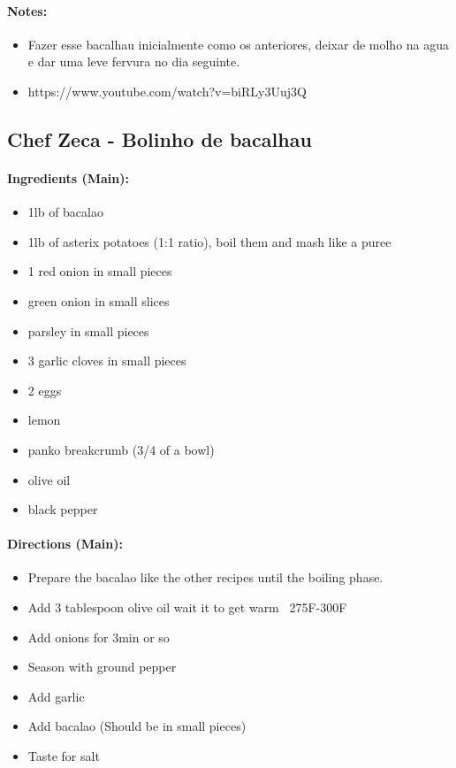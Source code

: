 \documentclass{article}
\begin{document}
\paragraph{Notes:}
\begin{itemize}
    \item Fazer esse bacalhau inicialmente como os anteriores, deixar de molho na agua e dar uma leve fervura no dia seguinte.
    \item https://www.youtube.com/watch?v=biRLy3Uuj3Q
\end{itemize}

\subsection{Chef Zeca - Bolinho de bacalhau} 

\paragraph{Ingredients (Main):}
\begin{itemize}
    \item 1lb of bacalao
    \item 1lb of asterix potatoes (1:1 ratio), boil them and mash like a puree
    \item 1 red onion in small pieces
    \item green onion in small slices
    \item parsley in small pieces
    \item 3 garlic cloves in small pieces
    \item 2 eggs
    \item lemon
    \item panko breakcrumb (3/4 of a bowl)
    \item olive oil
    \item black pepper
\end{itemize}  

\paragraph{Directions (Main):}
\begin{itemize}
    \item Prepare the bacalao like the other recipes until the boiling phase.
    \item Add 3 tablespoon olive oil wait it to get warm ~275F-300F
    \item Add onions for 3min or so
    \item Season with ground pepper
    \item Add garlic
    \item Add bacalao (Should be in small pieces)
    \item Taste for salt
\end{itemize}  
\end{document}
